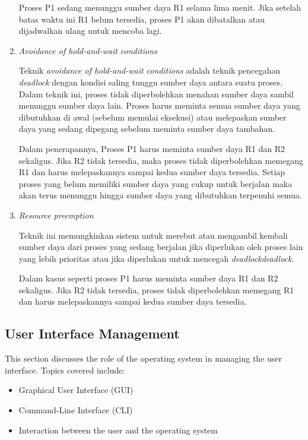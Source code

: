 \documentclass[12pt]{article}
\begin{document}
\begin{enumerate}
          \par Proses P1 sedang menunggu sumber daya R1 selama lima menit. Jika setelah batas
          waktu ini R1 belum tersedia, proses P1 akan dibatalkan atau dijadwalkan ulang
          untuk mencoba lagi.

    \item \textit{Avoidance of hold-and-wait conditions}

          \par Teknik \textit{avoidance of hold-and-wait conditions} adalah teknik pencegahan
          \textit{deadlock} dengan kondisi saling tunggu sumber daya antara suatu proses.
          Dalam teknik ini, proses tidak diperbolehkan menahan sumber daya sambil
          menunggu sumber daya lain. Proses harus meminta semua sumber daya yang
          dibutuhkan di awal (sebelum memulai eksekusi) atau melepaskan sumber daya yang
          sedang dipegang sebelum meminta sumber daya tambahan.

          \par Dalam penerapannya, Proses P1 harus meminta sumber daya R1 dan R2 sekaligus.
          Jika R2 tidak tersedia, maka proses tidak diperbolehkan memegang R1 dan harus
          melepaskannya sampai kedua sumber daya tersedia. Setiap proses yang belum
          memiliki sumber daya yang cukup untuk berjalan maka akan terus menunggu hingga
          sumber daya yang dibutuhkan terpenuhi semua.

    \item \textit{Resource preemption}

          \par Teknik ini memungkinkan sistem untuk merebut atau mengambil kembali sumber daya
          dari proses yang sedang berjalan jika diperlukan oleh proses lain yang lebih
          prioritas atau jika diperlukan untuk mencegah
          \textit{deadlock}\textit{deadlock}.

          \par Dalam kasus seperti proses P1 harus meminta sumber daya R1 dan R2 sekaligus.
          Jika R2 tidak tersedia, proses tidak diperbolehkan memegang R1 dan harus
          melepaskannya sampai kedua sumber daya tersedia.
\end{enumerate}

\subsection{User Interface Management}
This section discusses the role of the operating system in managing the user
interface. Topics covered include:
\begin{itemize}
    \item Graphical User Interface (GUI)
    \item Command-Line Interface (CLI)
    \item Interaction between the user and the operating system
\end{itemize}
\end{document}
